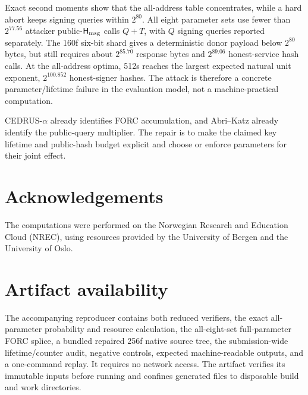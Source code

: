 \documentclass[11pt,a4paper]{article}
\newcommand{\Hmsg}{\ensuremath{\mathsf{H}_{\rm msg}}}
\begin{document}
Exact second moments show that the all-address table concentrates, while a hard
abort keeps signing queries within $2^{80}$.  All eight parameter sets use
fewer than $2^{77.56}$ attacker public-$\Hmsg$ calls $Q+T$, with $Q$ signing
queries reported separately.  The 160f six-bit
shard gives a deterministic donor payload below $2^{80}$ bytes, but still
requires about $2^{85.70}$ response bytes and $2^{89.06}$ honest-service hash
calls.  At the all-address optima, 512s reaches the largest expected natural
unit exponent, $2^{100.852}$ honest-signer hashes.  The attack is therefore a
concrete parameter/lifetime failure in the evaluation model, not a
machine-practical computation.

CEDRUS-$\alpha$ already identifies FORC accumulation, and Abri--Katz already
identify the public-query multiplier.  The repair is to make the claimed key
lifetime and public-hash budget explicit and choose or enforce parameters for
their joint effect.

\section*{Acknowledgements}

The computations were performed on the Norwegian Research and Education Cloud
(NREC), using resources provided by the University of Bergen and the University
of Oslo.

\section*{Artifact availability}

The accompanying reproducer contains both reduced verifiers, the exact
all-parameter probability and resource calculation, the all-eight-set
full-parameter FORC splice, a bundled repaired 256f native source tree, the
submission-wide lifetime/counter audit, negative controls, expected
machine-readable outputs, and a one-command replay.  It requires no network
access.  The artifact verifies its immutable inputs before running and confines
generated files to disposable build and work directories.
\end{document}
